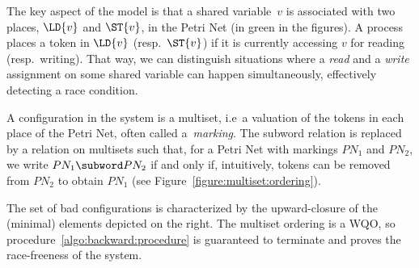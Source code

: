 The key aspect of the model is that a shared variable~$v$ is
associated with two places, $\LD{v}$ and $\ST{v}$, in the Petri Net
(in green in the figures). A process places a token in $\LD{v}$
(resp.\ $\ST{v}$) if it is currently accessing $v$ for reading (resp.\
writing).
%
That way, we can distinguish situations where a \emph{read} and a
\emph{write} assignment on some shared variable can happen
simultaneously, effectively detecting a race condition.

A configuration in the system is a multiset, i.e\ a valuation of the
tokens in each place of the Petri Net, often called a~\emph{marking}.
%
The subword relation is replaced by a relation on multisets such that,
for a Petri Net with markings $PN_1$ and $PN_2$, we write $PN_1
\subword PN_2$ if and only if, intuitively, tokens can be removed from
$PN_2$ to obtain $PN_1$ (see Figure~\ref{figure:multiset:ordering}).
%

\noindent%
\begin{wrapfigure}{r}{0.4\linewidth}
  \hfill%
\end{wrapfigure}
%
The set of bad configurations is characterized by the upward-closure
of the (minimal) elements depicted on the right.
%
The multiset ordering is a WQO, so
procedure~\ref{algo:backward:procedure} is guaranteed to terminate and
proves the race-freeness of the system.

